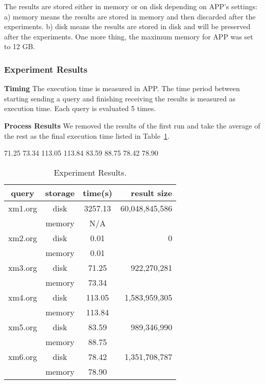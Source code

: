 The results are stored either in memory or on disk depending on APP's settings:
a) memory means the results are stored in memory and then discarded after the
experiments. b) disk means the results are stored in disk and will be preserved
after the experiments. One more thing, the maximum memory for APP was set to 12 GB.


\subsubsection{Experiment Results}

\textbf{Timing} The execution time is measured in APP. The time period between
starting sending a query and finishing receiving the results is measured as
execution time. Each query is evaluated 5 times. 

\textbf{Process Results}
We removed the results of the  first run and take the average of the rest as
the final execution time listed in Table~\ref{table:E2017120401_1}. 

 
71.25 
73.34 
113.05 
113.84 
83.59 
88.75 
78.42 
78.90 


\begin{table}[t]
	\caption{Experiment Results.}
	\label{table:E2017120401_1}
	\centering
	\begin{tabular}{c|c|c|r}
 		\hline \hline
 query  & storage & time(s)  &   result size  \\
 \hline \hline
 xm1.org &  disk   & 3257.13  & 60,048,845,586 \\
         & memory  &    N/A   &  \\
 \hline
 xm2.org &  disk   &    0.01  &              0 \\
         & memory  &    0.01  &  \\
  \hline
 xm3.org &  disk   &  71.25  &    922,270,281 \\
         & memory  &  73.34  &  \\
  \hline
 xm4.org &  disk   &  113.05  &  1,583,959,305 \\
         & memory  &  113.84  &  \\
  \hline
 xm5.org &  disk   &  83.59  &    989,346,990 \\
         & memory  &  88.75   &   \\
  \hline
 xm6.org &  disk   &  78.42   &  1,351,708,787 \\
         & memory  &  78.90   &   \\
 \hline \hline
	\end{tabular}
\end{table}


